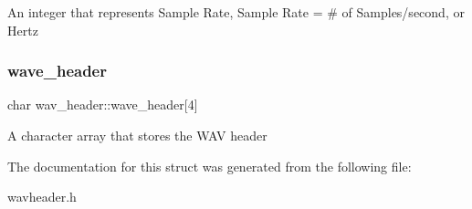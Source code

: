 An integer that represents Sample Rate, Sample Rate = \# of Samples/second, or Hertz \mbox{\label{structwav__header_a0dc0cff34ad7fe5e59c5cbcee1640354}} 
\subsubsection{\texorpdfstring{wave\+\_\+header}{wave\_header}}
{\footnotesize\ttfamily char wav\+\_\+header\+::wave\+\_\+header\mbox{[}4\mbox{]}}

A character array that stores the W\+AV header 

The documentation for this struct was generated from the following file\+:\begin{DoxyCompactItemize}
\item 
wavheader.\+h\end{DoxyCompactItemize}
